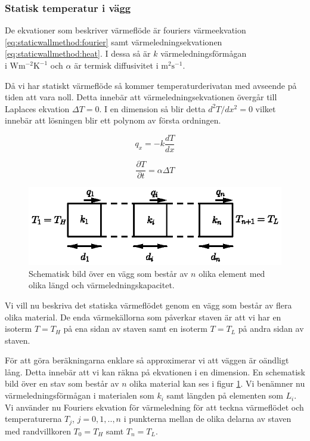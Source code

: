 \subsubsection{Statisk temperatur i vägg}


De ekvationer som beskriver värmeflöde är fouriers värmeekvation
\eqref{eq:staticwallmethod:fourier} samt värmeledningsekvationen
\eqref{eq:staticwallmethod:heat}. I dessa så är
$k$ värmeledningsförmågan\\i $\mbox{W}\mbox{m}^{-2}\mbox{K}^{-1}$ och
$\alpha$ är termisk diffusivitet i $\mbox{m}^2\mbox{s}^{-1}$. \cite{physicshandbook}

Då vi har statiskt värmeflöde
så kommer temperaturderivatan med avseende på tiden att vara noll.
Detta innebär att värmeledningsekvationen övergår till Laplaces ekvation
$\Delta{}T = 0$. I en dimension så blir detta $d^2T/dx^2 = 0$ vilket innebär
att lösningen blir ett polynom av första ordningen.  

\begin{equation}
\label{eq:staticwallmethod:fourier}
q_x = -k\frac{dT}{dx}
\end{equation}

\begin{equation}
\label{eq:staticwallmethod:heat}
\frac{\partial{}T}{\partial{}t} = \alpha\Delta{}T
\end{equation}

\begin{figure}
\centering
\includegraphics{images/wall.eps}
\caption{Schematisk bild över en vägg som består av $n$ olika element med olika
längd och värmeledningskapacitet.}\label{fig:staticwallmethod:wall}
\end{figure}

\noindent
Vi vill nu beskriva det statiska värmeflödet genom en vägg som består
av flera olika material. De enda värmekällorna som påverkar staven
är att vi har en isoterm $T = T_H$ på ena sidan av staven
samt en isoterm $T = T_L$ på andra sidan av staven.

För att göra beräkningarna enklare så
approximerar vi att väggen är oändligt lång. Detta innebär att vi kan räkna
på ekvationen i en dimension. En schematisk bild över en stav som består av
$n$ olika material kan ses i figur \ref{fig:staticwallmethod:wall}.
Vi benämner nu värmeledningsförmågan i materialen som $k_i$ samt längden
på elementen som $L_i$. Vi använder nu Fouriers ekvation för värmeledning för
att teckna värmeflödet och temperaturerna $T_j$, $j=0,1,..,n$ i punkterna
mellan de olika delarna av staven med randvillkoren $T_0 = T_H$ samt
$T_n = T_L$.

